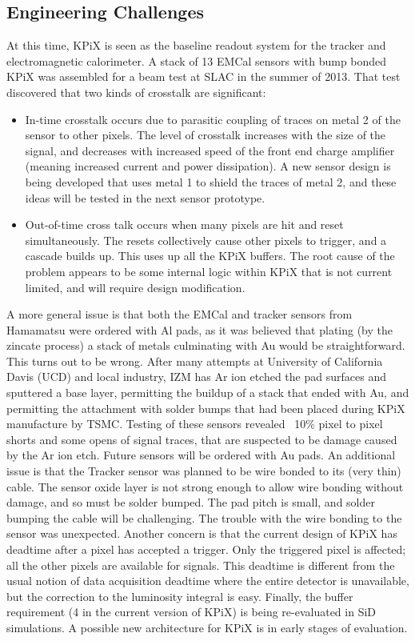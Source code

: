 \subsection{Engineering Challenges}
At this time, KPiX is seen as the baseline readout system for the tracker and electromagnetic calorimeter. A stack of 13 EMCal sensors with bump bonded KPiX was assembled for a beam test at SLAC in the summer of 2013. That test discovered that two kinds of crosstalk are significant:
\begin{itemize}
	\item In-time crosstalk occurs due to parasitic coupling of traces on metal 2 of the sensor to other pixels. The level of crosstalk increases with the size of the signal, and decreases with increased speed of the front end charge amplifier (meaning increased current and power dissipation).  A new sensor design is being developed that uses metal 1 to shield the traces of metal 2, and these ideas will be tested in the next sensor prototype.
	\item Out-of-time cross talk occurs when many pixels are hit and reset simultaneously. The resets collectively cause other pixels to trigger, and a cascade builds up. This uses up all the KPiX buffers. The root cause of the problem appears to be some internal logic within KPiX that is not current limited, and will require design modification.
\end{itemize}
A more general issue is that both the EMCal and tracker sensors from Hamamatsu were ordered with Al pads, as it was believed that plating (by the zincate process) a stack of metals culminating with Au would be straightforward. This turns out to be wrong. After many attempts at University of California Davis (UCD) and local industry, IZM  has Ar ion etched the pad surfaces and sputtered a base layer, permitting the buildup of a stack that ended with Au, and permitting the attachment with solder bumps that had been placed during KPiX manufacture by TSMC. Testing of these sensors revealed ~10\% pixel to pixel shorts and some opens of signal traces, that are suspected to be damage caused by the Ar ion etch. Future sensors will be ordered with Au pads. 
An additional issue is that the Tracker sensor was planned to be wire bonded to its (very thin) cable. The sensor oxide layer is not strong enough to allow wire bonding without damage, and so must be solder bumped. The pad pitch is small, and solder bumping the cable will be challenging. The trouble with the wire bonding to the sensor was unexpected.
Another concern is that the current design of KPiX has deadtime after a pixel has accepted a trigger. Only the triggered pixel is affected; all the other pixels are available for signals. This deadtime is different from the usual notion of data acquisition deadtime where the entire detector is unavailable, but the correction to the luminosity integral is easy. Finally, the buffer requirement (4 in the current version of KPiX) is being re-evaluated in SiD simulations. A possible new architecture for KPiX is in early stages of evaluation. 
